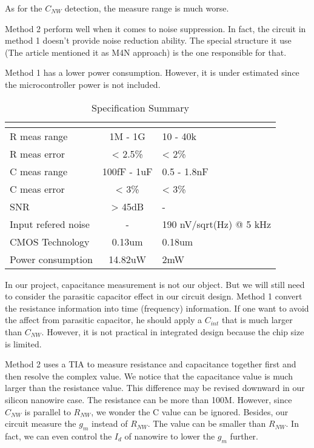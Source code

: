 As for the $C_{NW}$ detection,
the measure range is much worse.{\color{red}{Reason}}

Method 2 perform well when it comes to noise suppression.
In fact, the circuit in method 1 doesn't provide noise reduction ability.
The special structure it use (The article \cite{Juv1} mentioned it as M4N approach) is the one responsible for that.

Method 1 has a lower power consumption. However, it is under estimated since the microcontroller power is not included.

\begin{table}[!htb]
    {\fontfamily{}\fontsize{10}{14}\selectfont
    \centering
    \begin{tabular}{l|cp{4cm}}
        & \cite{Juv2} & \cite{Jlockin}\\
        \hline
        R meas range & 1M - 1G & 10 - 40k\\
        \hline
        R meas error & < 2.5\% & < 2\%\\
        \hline
        C meas range & 100fF - 1uF & 0.5 - 1.8nF\\
        \hline
        C meas error & < 3\% & < 3\%\\
        \hline
        SNR & > 45dB & - \\
        \hline
        Input refered noise & - & 190 nV/sqrt(Hz) @ 5 kHz \\
        \hline
        CMOS Technology & 0.13um & 0.18um\\
        \hline
        Power consumption & 14.82uW & 2mW\\
    \end{tabular}
    \caption{Specification Summary}
    \label{tb:LVtable}
    }
\end{table}

In our project, capacitance measurement is not our object.
But we will still need to consider the parasitic capacitor effect in our circuit design.
Method 1 convert the resistance information into time (frequency) information.
If one want to avoid the affect from parasitic capacitor, he should apply a $C_{int}$ that is much larger than $C_{NW}$.
However, it is not practical in integrated design because the chip size is limited.

Method 2 uses a TIA to measure resistance and capacitance together first and then resolve the complex value.
We notice that the capacitance value is much larger than the resistance value.
This difference may be revised downward in our silicon nanowire case.
The resistance can be more than 100M.
However, since $C_{NW}$ is parallel to $R_{NW}$, we wonder the C value can be ignored.
Besides, our circuit measure the $g_m$ instead of $R_{NW}$.
The value can be smaller than $R_{NW}$.
In fact, we can even control the $I_d$ of nanowire to lower the $g_m$ further.

